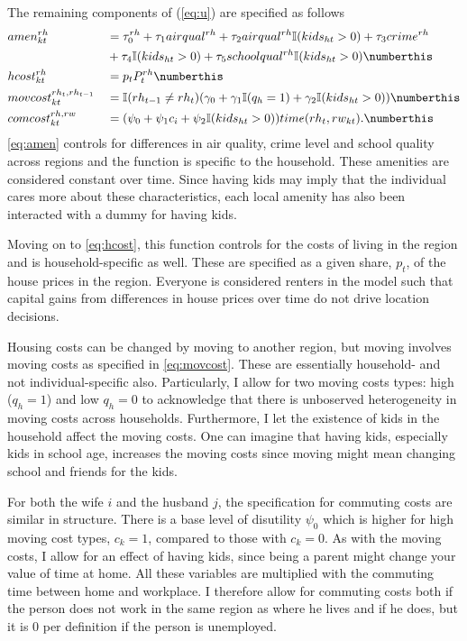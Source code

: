 The remaining components of (\ref{eq:u}) are specified as follows
\begin{alignat*}{3}
& amen_{kt}^{rh} &&= \tau_0^{rh}+\tau_1 airqual^{rh}+\tau_2 airqual^{rh}\mathbb{I}{(kids_{ht}>0)}+\tau_3 crime^{rh} \\
& &&+\tau_4 \mathbb{I}{(kids_{ht}>0)}+\tau_5 schoolqual^{rh}\mathbb{I}{(kids_{ht}>0)}  \label{eq:amen} \numberthis \\
& hcost_{kt}^{rh} &&= p_t P^{rh}_t \label{eq:hcost} \numberthis \\
& movcost_{kt}^{rh_t,rh_{t-1}} &&= \mathbb{I}{(rh_{t-1} \neq rh_t)}  (\gamma_{0}+\gamma_1\mathbb{I}{(q_h=1)}+ \gamma_2 \mathbb{I}{(kids_{ht}>0))} \label{eq:movcost} \numberthis \\
& comcost_{kt}^{rh,rw} &&=(\psi_0+\psi_1 c_i+\psi_2 \mathbb{I}{(kids_{ht}>0)} ) time(rh_t,rw_{kt}). \label{eq:trans} \numberthis
\end{alignat*}
\eqref{eq:amen} controls for differences in air quality, crime level and school quality across regions and the function is specific to the household. These amenities are considered constant over time. Since having kids may imply that the individual cares more about these characteristics, each local amenity has also been interacted with a dummy for having kids. 

Moving on to \eqref{eq:hcost}, this function controls for the costs of living in the region and is household-specific as well. These are specified as a given share, $p_t$, of the house prices in the region. Everyone is considered renters in the model such that capital gains from differences in house prices over time do not drive location decisions.

Housing costs can be changed by moving to another region, but moving involves moving costs as specified in \eqref{eq:movcost}. These are essentially household- and not individual-specific also. Particularly, I allow for two moving costs types: high ($q_h=1$) and low $q_h=0$ to acknowledge that there is unboserved heterogeneity in moving costs across households. Furthermore, I let the existence of kids in the household affect the moving costs. One can imagine that having kids, especially kids in school age, increases the moving costs since moving might mean changing school and friends for the kids. 

For both the wife $i$ and the husband $j$, the specification for commuting costs are similar in structure. There is a base level of disutility $\psi_0$ which is higher for high moving cost types, $c_k=1$, compared to those with $c_k=0$. As with the moving costs, I allow for an effect of having kids, since being a parent might change your value of time at home. All these variables are multiplied with the commuting time between home and workplace. I therefore allow for commuting costs both if the person does not work in the same region as where he lives and if he does, but it is 0 per definition if the person is unemployed. 

